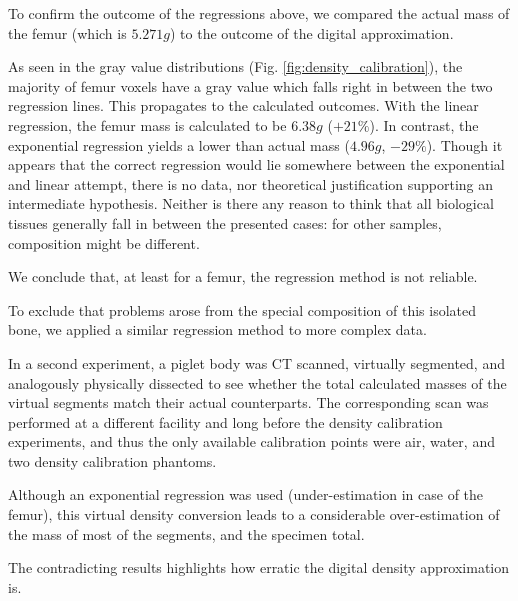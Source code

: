 To confirm the outcome of the regressions above, we compared the actual mass of the femur (which is \(5.271 g\)) to the outcome of the digital approximation.

As seen in the gray value distributions (Fig. \ref{fig:density_calibration}), the majority of femur voxels have a gray value which falls right in between the two regression lines.
This propagates to the calculated outcomes.
With the linear regression, the femur mass is calculated to be \(6.38 g\) (\(+21 \%\)).
In contrast, the exponential regression yields a lower than actual mass (\(4.96 g\), \(-29 \%\)).
Though it appears that the correct regression would lie somewhere between the exponential and linear attempt, there is no data, nor theoretical justification supporting an intermediate hypothesis.
Neither is there any reason to think that all biological tissues generally fall in between the presented cases: for other samples, composition might be different.

We conclude that, at least for a femur, the regression method is not reliable.


To exclude that problems arose from the special composition of this isolated bone, we applied a similar regression method to more complex data.

In a second experiment, a piglet body was CT scanned, virtually segmented, and analogously physically dissected to see whether the total calculated masses of the virtual segments match their actual counterparts.
The corresponding scan was performed at a different facility and long before the density calibration experiments, and thus the only available calibration points were air, water, and two density calibration phantoms.

Although an exponential regression was used (under-estimation in case of the femur), this virtual density conversion leads to a considerable over-estimation of the mass of most of the segments, and the specimen total.

The contradicting results highlights how erratic the digital density approximation is.



